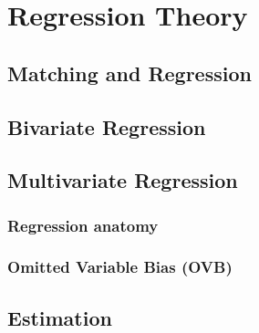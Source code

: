 \chapter{Regression Theory}
    \section{Matching and Regression}
    \section{Bivariate Regression}
    \section{Multivariate Regression}
        \subsection{Regression anatomy}

        \subsection{Omitted Variable Bias (OVB)}
    \section{Estimation}